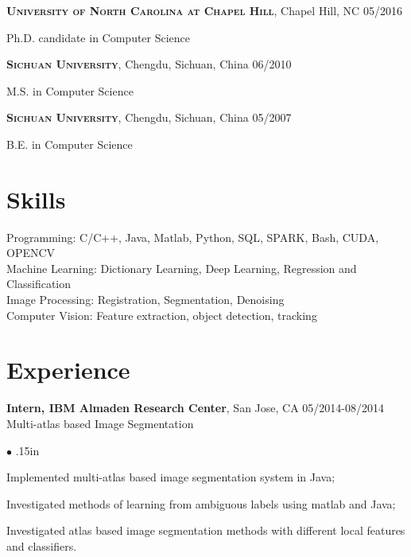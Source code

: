 \documentclass[line,margin]{res}
\newenvironment{bullets}{\begin{list}{\tiny$\bullet$}{\topsep 0pt \itemsep -2pt \leftmargin .15in}}{\vspace*{4pt}\end{list}}
\newenvironment{list1}{
	\begin{list}{\ding{113}}{%
			\setlength{\itemsep}{0in}
			\setlength{\parsep}{0in} \setlength{\parskip}{0in}
			\setlength{\topsep}{0in} \setlength{\partopsep}{0in} 
			\setlength{\leftmargin}{0.17in}}}{\end{list}}
\begin{document}
\begin{resume}
		\textsc{\textbf{University of North Carolina at Chapel Hill}}, Chapel Hill, NC \hfill{05/2016}\\
		\vspace*{-.15in}
		\begin{list1}
			\item[] Ph.D. candidate in Computer Science %
		\end{list1}
		\vspace*{-.15in}
		\textsc{\textbf{Sichuan University}}, Chengdu, Sichuan, China \hfill {06/2010} \\
		\vspace*{-.15in}
		\begin{list1}
			\item[] M.S. in Computer Science  %
		\end{list1}
		\vspace*{-.15in}
		\textsc{\textbf{Sichuan University}}, Chengdu, Sichuan, China \hfill{05/2007}\\
		\vspace*{-.15in}
		\begin{list1}
			\item[] B.E. in Computer Science  %
		\end{list1}
		
		\section{\sc Skills}
		\smallskip
		
		Programming: C/C++, Java, Matlab, Python, SQL, SPARK, Bash, CUDA, OPENCV\\
		Machine Learning: Dictionary Learning, Deep Learning, Regression and Classification\\
		Image Processing: Registration, Segmentation, Denoising\\
		Computer Vision: Feature extraction, object detection, tracking
		
		
		\vspace{-.05in}
		\section{\sc Experience}
		\smallskip
		
		\textbf{Intern, IBM Almaden Research Center}, San Jose, CA \hfill      05/2014-08/2014 \\
		Multi-atlas based Image Segmentation
		\begin{bullets} 
			\item Implemented multi-atlas based image segmentation system in Java;
			\item Investigated methods of learning from ambiguous labels using matlab and Java;
			\item Investigated atlas based image segmentation methods with different local features and classifiers.
		\end{bullets}
		\vspace{-.3in}
		

\end{resume}
\end{document}
